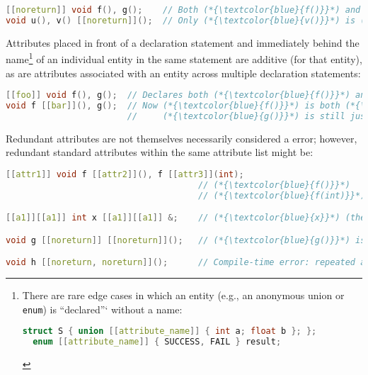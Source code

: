 \documentclass[twoside,10pt,letterpaper,usenames]{newstyle-PearsonGeneric-7-38}
\begin{document}
\begin{lstlisting}[language=C++]
[[noreturn]] void f(), g();    // Both (*{\textcolor{blue}{f()}}*) and (*{\textcolor{blue}{g()}}*) are (*{\textcolor{blue}{noreturn}}*).
void u(), v() [[noreturn]]();  // Only (*{\textcolor{blue}{v()}}*) is (*{\textcolor{blue}{noreturn}}*).
\end{lstlisting}
    

Attributes placed in front of a declaration statement and immediately
behind the name{\cprotect\footnote{There are rare edge cases in which an
  entity (e.g., an anonymous union or \texttt{enum}) is ``declared''`
  without a name:

  \begin{lstlisting}[language=C++, basicstyle={\ttfamily\footnotesize}]
  struct S { union [[attribute_name]] { int a; float b }; };
  enum [[attribute_name]] { SUCCESS, FAIL } result;
  \end{lstlisting}
      }} of an individual entity in the same statement are additive (for
that entity), as are attributes associated with an entity across
multiple declaration statements:

\begin{lstlisting}[language=C++]
[[foo]] void f(), g();  // Declares both (*{\textcolor{blue}{f()}}*) and (*{\textcolor{blue}{g()}}*) to be (*{\textcolor{blue}{foo}}*).
void f [[bar]](), g();  // Now (*{\textcolor{blue}{f()}}*) is both (*{\textcolor{blue}{foo}}*) and (*{\textcolor{blue}{bar}}*) while
                        //     (*{\textcolor{blue}{g()}}*) is still just (*{\textcolor{blue}{foo}}*).
\end{lstlisting}
    

Redundant attributes are not themselves necessarily considered a error;
however, redundant standard attributes within the same attribute list
might be:

\begin{lstlisting}[language=C++]
[[attr1]] void f [[attr2]](), f [[attr3]](int);
                                      // (*{\textcolor{blue}{f()}}*)    is (*{\textcolor{blue}{attr1}}*) and (*{\textcolor{blue}{attr2}}*)
                                      // (*{\textcolor{blue}{f(int)}}*) is (*{\textcolor{blue}{attr1}}*) and (*{\textcolor{blue}{attr3}}*)

[[a1]][[a1]] int x [[a1]][[a1]] &;    // (*{\textcolor{blue}{x}}*) (the reference itself) is (*{\textcolor{blue}{a1}}*)

void g [[noreturn]] [[noreturn]]();   // (*{\textcolor{blue}{g()}}*) is (*{\textcolor{blue}{noreturn}}*)

void h [[noreturn, noreturn]]();      // Compile-time error: repeated attribute
\end{lstlisting}
    
\end{document}
